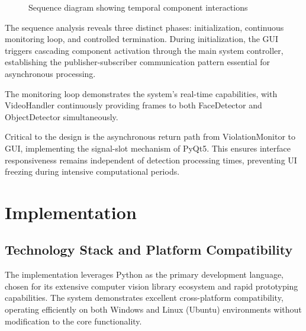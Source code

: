 \documentclass[conference]{IEEEtran}
\begin{document}
\begin{figure}[H]
    \caption{Sequence diagram showing temporal component interactions}
\end{figure}

The sequence analysis reveals three distinct phases: initialization, continuous monitoring 
loop, and controlled termination. During initialization, the GUI triggers cascading component 
activation through the main system controller, establishing the publisher-subscriber 
communication pattern essential for asynchronous processing.

The monitoring loop demonstrates the system's real-time capabilities, with VideoHandler 
continuously providing frames to both FaceDetector and ObjectDetector simultaneously. 

Critical to the design is the asynchronous return path from ViolationMonitor to GUI, 
implementing the signal-slot mechanism of PyQt5. This ensures interface responsiveness 
remains independent of detection processing times, preventing UI freezing during intensive 
computational periods.

\section{Implementation}

\subsection{Technology Stack and Platform Compatibility}

The implementation leverages Python as the primary development language, chosen for its 
extensive computer vision library ecosystem and rapid prototyping capabilities. The system 
demonstrates excellent cross-platform compatibility, operating efficiently on both Windows 
and Linux (Ubuntu) environments without modification to the core functionality.
\end{document}

